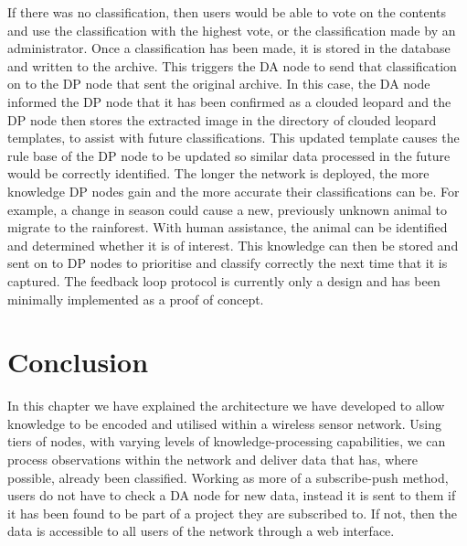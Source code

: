 			\DIFaddend If there was no classification, then users would be able to vote on the contents and use the classification with the highest vote, or the classification made by an administrator. Once a classification has been made, it is stored in the database and written to the archive. This triggers the DA node to send that classification on to the DP node that sent the original archive. In this case, the DA node informed the DP node that it has been confirmed as a clouded leopard and the DP node then stores the extracted image in the directory of clouded leopard templates, to assist with future classifications. This updated template causes the rule base of the DP node to be updated so similar data processed in the future would be correctly identified. The longer the network is deployed, the more knowledge DP nodes \DIFaddbegin {}\DIFaddend gain and the more accurate their classifications can be. For example, a change in season could cause a new, previously unknown animal to migrate to the rainforest. With human assistance, the animal can be identified and determined whether it is of interest. This knowledge can then be stored and sent on to DP nodes to prioritise and classify correctly the next time that it is captured. The feedback loop protocol is currently only a design and has been minimally implemented as a proof of concept\DIFaddbegin {}\DIFaddend .

	\section{Conclusion}\label{arch:conc}
		In this chapter we have explained the architecture we have developed to allow knowledge to be encoded and utilised within a wireless sensor network. Using tiers of nodes, with varying levels of knowledge-processing capabilities, we can process observations within the network and deliver data that has, where possible, already been classified. Working as more of a subscribe-push method, users do not have to check a DA node for new data, instead it is sent to them if it has been found to be part of a project they are subscribed to. If not, then the data is accessible to all users of the network through a web interface.

		\DIFaddbegin {}

